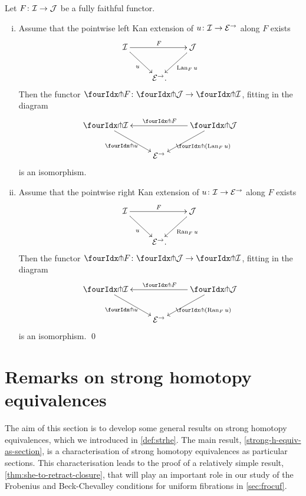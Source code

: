 \documentclass[reqno,10pt,a4paper,oneside,draft]{amsart}
\begin{document}
\begin{proposition} \label{kan-extension-closure}
Let $F \colon \mathcal{I} \to \mathcal{J}$ be a fully faithful functor.
\begin{enumerate}[(i)]
\item Assume that the pointwise left Kan extension of $u \colon \mathcal{I} \to \mathcal{E}^\to$ along $F$ exists
\[
\xymatrix{
  \cal{I}
  \ar[dr]_{u}
  \ar[rr]^{F}
&&
  \cal{J}
  \ar[dl]^{\Lan_F u}
\\&
  \catE^\to \rlap{.}
}
\]
Then the functor $\liftr{F} \co \liftr{\cal{J}} \to \liftr{\cal{I}}$, fitting in the diagram
\[
\xymatrix{
  \liftr{\cal{I}}
  \ar[dr]_{\liftr{u}}
&&
  \liftr{\cal{J}}
  \ar[ll]_{\liftr{F}}
  \ar[dl]^{\liftr{(\Lan_F u)}}
\\&
  \catE^\to
}
\]
is an isomorphism.
\item Assume that the pointwise right Kan extension of $u \colon \mathcal{I} \to \mathcal{E}^\to$ along $F$ exists
\[
\xymatrix{
  \cal{I}
  \ar[dr]_{u}
  \ar[rr]^{F}
&&
  \cal{J}
  \ar[dl]^{\Ran_F u}
\\&
  \catE^\to \rlap{.}
}
\]
Then the functor $\liftl{F} \co \liftl{\cal{J}} \to \liftl{\cal{I}}$, fitting in the diagram
\[
\xymatrix{
  \liftl{\cal{I}}
  \ar[dr]_{\liftl{u}}
&&
  \liftl{\cal{J}}
  \ar[ll]_{\liftl{F}}
  \ar[dl]^{\liftl{(\Ran_F u)}}
\\&
  \catE^\to
}
\]
is an isomorphism.
\qed
\end{enumerate}
\end{proposition}


\section{Remarks on strong homotopy equivalences}
\label{sec:remshe}

The aim of this section is to develop some general results on strong homotopy equivalences, which we introduced in \cref{def:strhe}.
The main result, \cref{strong-h-equiv-as-section}, is a characterisation of strong homotopy equivalences as particular sections.
This characterisation leads to the proof of a relatively simple result, \cref{thm:she-to-retract-closure}, that will play an important role in our study of the Frobenius and Beck-Chevalley conditions for uniform fibrations in \cref{sec:frocuf}.
\end{document}
